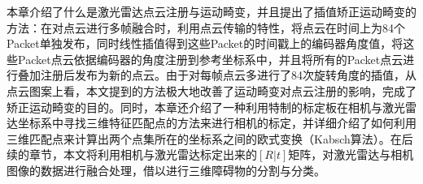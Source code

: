 本章介绍了什么是激光雷达点云注册与运动畸变，并且提出了插值矫正运动畸变的方法：在对点云进行多帧融合时，利用点云传输的特性，将点云在时间上为84个Packet单独发布，同时线性插值得到这些Packet的时间戳上的编码器角度值，将这些Packet点云依据编码器的角度注册到参考坐标系中，并且将所有的Packet点云进行叠加注册后发布为新的点云。由于对每帧点云多进行了84次旋转角度的插值，从点云图案上看，本文提到的方法极大地改善了运动畸变对点云注册的影响，完成了矫正运动畸变的目的。同时，本章还介绍了一种利用特制的标定板在相机与激光雷达坐标系中寻找三维特征匹配点的方法来进行相机的标定，并详细介绍了如何利用三维匹配点来计算出两个点集所在的坐标系之间的欧式变换（Kabsch算法）。在后续的章节，本文将利用相机与激光雷达标定出来的$[R|t]$矩阵，对激光雷达与相机图像的数据进行融合处理，借以进行三维障碍物的分割与分类。